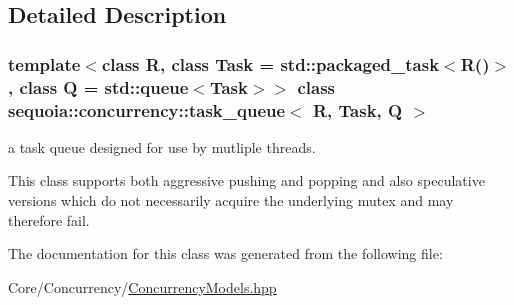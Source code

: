 \subsection{Detailed Description}
\subsubsection*{template$<$class R, class Task = std\+::packaged\+\_\+task$<$\+R()$>$, class Q = std\+::queue$<$\+Task$>$$>$\newline
class sequoia\+::concurrency\+::task\+\_\+queue$<$ R, Task, Q $>$}

a task queue designed for use by mutliple threads. 

This class supports both aggressive pushing and popping and also speculative versions which do not necessarily acquire the underlying mutex and may therefore fail. 

The documentation for this class was generated from the following file\+:\begin{DoxyCompactItemize}
\item 
Core/\+Concurrency/\mbox{\hyperlink{_concurrency_models_8hpp}{Concurrency\+Models.\+hpp}}\end{DoxyCompactItemize}
